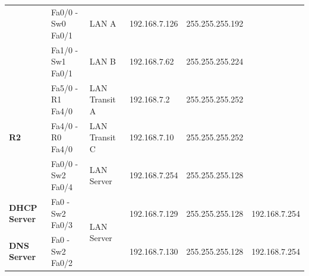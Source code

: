 \documentclass[11pt,a4paper]{report}
\begin{document}
\begin{center}
\begin{longtable}{@{}llllll@{}}
                                                   & Fa0/0 - Sw0 Fa0/1                                        & LAN A                                                 & 192.168.7.126                                    & 255.255.255.192                                           &                                                       \\
                                                   & Fa1/0 - Sw1 Fa0/1                                        & LAN B                                                 & 192.168.7.62                                     & 255.255.255.224                                           &                                                       \\* \midrule
\multirow{3}{*}{\textbf{R2}}                       & Fa5/0 - R1 Fa4/0                                         & LAN Transit A                                         & 192.168.7.2                                      & 255.255.255.252                                           &                                                       \\
                                                   & Fa4/0 - R0 Fa4/0                                         & LAN Transit C                                         & 192.168.7.10                                     & 255.255.255.252                                           &                                                       \\
                                                   & Fa0/0 - Sw2 Fa0/4                                        & LAN Server                                            & 192.168.7.254                                    & 255.255.255.128                                           &                                                       \\* \midrule
\textbf{DHCP Server}                               & Fa0 - Sw2 Fa0/3                                          & \multirow{3}{*}{LAN Server}                           & 192.168.7.129                                    & 255.255.255.128                                           & 192.168.7.254                                         \\
\textbf{DNS Server}                                & Fa0 - Sw2 Fa0/2                                          &                                                       & 192.168.7.130                                    & 255.255.255.128                                           & 192.168.7.254                                         \\

\end{longtable}
\end{center}
\end{document}
